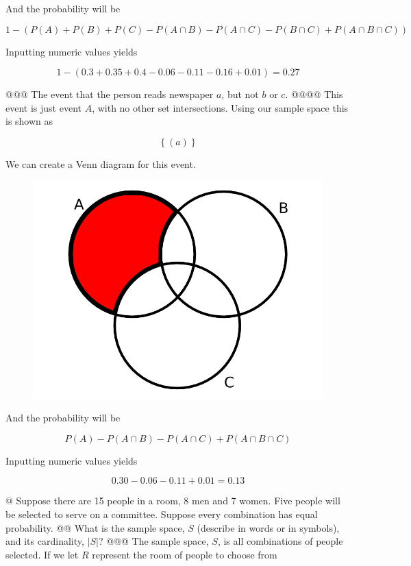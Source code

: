 \documentclass[10pt]{article}
\begin{document}
\begin{easylist}[enumerate]
        And the probability will be

        \[ 1 - \left( P(A) + P(B) + P(C) - P(A \cap B) - P(A \cap C) - P(B \cap C) + P(A \cap B \cap C) \right) \]

        Inputting numeric values yields

        \[ 1 - (0.3 + 0.35 + 0.4 - 0.06 - 0.11 - 0.16 + 0.01) = \boxed{0.27} \]

    @@@ The event that the person reads newspaper $a$, but not $b$ or $c$.
    @@@@ This event is just event $A$, with no other set intersections. Using our sample space this is shown as

        \[ \left\{ (a) \right\} \]

        We can create a Venn diagram for this event.

        \begin{figure}[!ht]
            \centering
            \includegraphics[scale=0.25]{./img/venn4.png}
        \end{figure}

        And the probability will be

        \[ P(A) - P(A \cap B) - P(A \cap C) + P(A \cap B \cap C) \]

        Inputting numeric values yields

        \[ 0.30 - 0.06 - 0.11 + 0.01 = \boxed{0.13} \]

    @ Suppose there are 15 people in a room, 8 men and 7 women. Five people will be selected to serve on a committee. Suppose every combination has equal probability.
    @@ What is the sample space, $S$ (describe in words or in symbols), and its cardinality, $|S|$?
    @@@ The sample space, $S$, is all combinations of people selected. If we let $R$ represent the room of people to choose from


\end{easylist}
\end{document}
